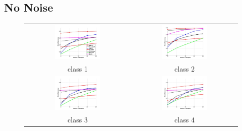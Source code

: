 \subsection{No Noise}
\begin{figure}[h]
	\centering
	\begin{tabular}{cc}
		\includegraphics[width=0.45\textwidth]{appendix/tables/MNIST_Rate_0_class_1.jpg} & 
		\includegraphics[width=0.45\textwidth]{appendix/tables/MNIST_Rate_0_class_2.jpg} \\
		class 1 & class 2\\
		\includegraphics[width=0.45\textwidth]{appendix/tables/MNIST_Rate_0_class_3.jpg} & 
		\includegraphics[width=0.45\textwidth]{appendix/tables/MNIST_Rate_0_class_4.jpg} \\
		class 3 & class 4\\
	\end{tabular}
\end{figure}
